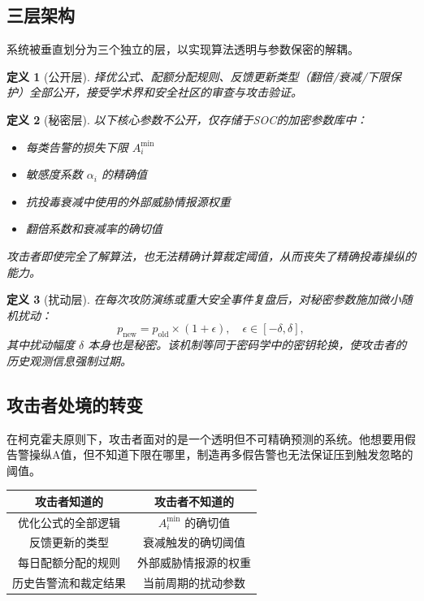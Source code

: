 \documentclass[11pt,a4paper]{article}
\newtheorem{definition}{定义}[section]
\begin{document}
\subsection{三层架构}

系统被垂直划分为三个独立的层，以实现算法透明与参数保密的解耦。

\begin{definition}[公开层]
择优公式、配额分配规则、反馈更新类型（翻倍/衰减/下限保护）全部公开，接受学术界和安全社区的审查与攻击验证。
\end{definition}

\begin{definition}[秘密层]
以下核心参数不公开，仅存储于SOC的加密参数库中：
\begin{itemize}
    \item 每类告警的损失下限 \(A_i^{\min}\)
    \item 敏感度系数 \(\alpha_i\) 的精确值
    \item 抗投毒衰减中使用的外部威胁情报源权重
    \item 翻倍系数和衰减率的确切值
\end{itemize}
攻击者即使完全了解算法，也无法精确计算裁定阈值，从而丧失了精确投毒操纵的能力。
\end{definition}

\begin{definition}[扰动层]
在每次攻防演练或重大安全事件复盘后，对秘密参数施加微小随机扰动：
\[
p_{\text{new}} = p_{\text{old}} \times (1 + \epsilon), \quad \epsilon \in [-\delta, \delta],
\]
其中扰动幅度 \(\delta\) 本身也是秘密。该机制等同于密码学中的密钥轮换，使攻击者的历史观测信息强制过期。
\end{definition}

\subsection{攻击者处境的转变}

在柯克霍夫原则下，攻击者面对的是一个透明但不可精确预测的系统。他想要用假告警操纵A值，但不知道下限在哪里，制造再多假告警也无法保证压到触发忽略的阈值。

\begin{center}
\begin{tabular}{c|c}
\toprule
\textbf{攻击者知道的} & \textbf{攻击者不知道的} \\
\midrule
优化公式的全部逻辑 & \(A_i^{\min}\) 的确切值 \\
反馈更新的类型 & 衰减触发的确切阈值 \\
每日配额分配的规则 & 外部威胁情报源的权重 \\
历史告警流和裁定结果 & 当前周期的扰动参数 \\
\bottomrule
\end{tabular}
\end{center}
\end{document}
